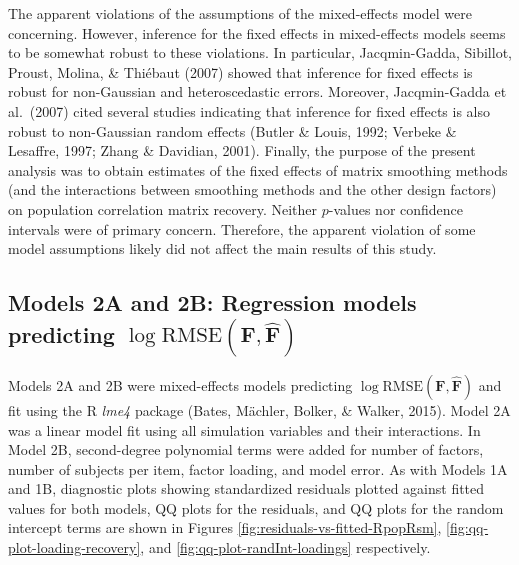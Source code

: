 \documentclass[
  english,
  man]{apa6}
\begin{document}
\begin{appendix}
The apparent violations of the assumptions of the mixed-effects model
were concerning. However, inference for the fixed effects in
mixed-effects models seems to be somewhat robust to these violations. In
particular, Jacqmin-Gadda, Sibillot, Proust, Molina, \& Thiébaut (2007)
showed that inference for fixed effects is robust for non-Gaussian and
heteroscedastic errors. Moreover, Jacqmin-Gadda et al.~(2007) cited
several studies indicating that inference for fixed effects is also
robust to non-Gaussian random effects (Butler \& Louis, 1992; Verbeke \&
Lesaffre, 1997; Zhang \& Davidian, 2001). Finally, the purpose of the
present analysis was to obtain estimates of the fixed effects of matrix
smoothing methods (and the interactions between smoothing methods and
the other design factors) on population correlation matrix recovery.
Neither \(p\)-values nor confidence intervals were of primary concern.
Therefore, the apparent violation of some model assumptions likely did
not affect the main results of this study.

\hypertarget{models-2a-and-2b-regression-models-predicting-log-textrmrmsemathbff-hatmathbff}{%
\subsection{\texorpdfstring{Models 2A and 2B: Regression models
predicting
\(\log \textrm{RMSE}(\mathbf{F}, \hat{\mathbf{F}})\)}{Models 2A and 2B: Regression models predicting \textbackslash log \textbackslash textrm\{RMSE\}(\textbackslash mathbf\{F\}, \textbackslash hat\{\textbackslash mathbf\{F\}\})}}\label{models-2a-and-2b-regression-models-predicting-log-textrmrmsemathbff-hatmathbff}}

Models 2A and 2B were mixed-effects models predicting
\(\log \textrm{RMSE}(\mathbf{F}, \hat{\mathbf{F}})\) and fit using the R
\emph{lme4} package (Bates, Mächler, Bolker, \& Walker, 2015). Model 2A
was a linear model fit using all simulation variables and their
interactions. In Model 2B, second-degree polynomial terms were added for
number of factors, number of subjects per item, factor loading, and
model error. As with Models 1A and 1B, diagnostic plots showing
standardized residuals plotted against fitted values for both models, QQ
plots for the residuals, and QQ plots for the random intercept terms are
shown in Figures \ref{fig:residuals-vs-fitted-RpopRsm},
\ref{fig:qq-plot-loading-recovery}, and
\ref{fig:qq-plot-randInt-loadings} respectively.

\begin{figure}


\end{figure}
\end{appendix}
\end{document}
